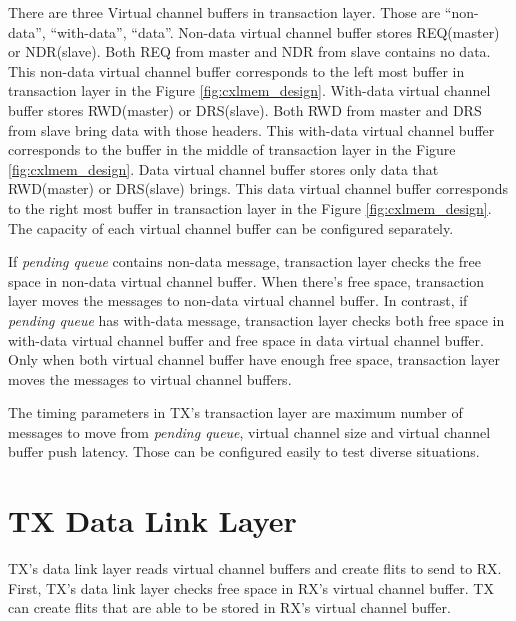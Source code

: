 There are three Virtual channel buffers in transaction layer. Those are ``non-data'', ``with-data'', ``data''. Non-data virtual channel buffer stores REQ(master) or NDR(slave). Both REQ from master and NDR from slave contains no data. This non-data virtual channel buffer corresponds to the left most buffer in transaction layer in the Figure \ref{fig:cxlmem_design}. With-data virtual channel buffer stores RWD(master) or DRS(slave). Both RWD from master and DRS from slave bring data with those headers. This with-data virtual channel buffer corresponds to the buffer in the middle of transaction layer in the Figure \ref{fig:cxlmem_design}. Data virtual channel buffer stores only data that RWD(master) or DRS(slave) brings. This data virtual channel buffer corresponds to the right most buffer in transaction layer in the Figure \ref{fig:cxlmem_design}. The capacity of each virtual channel buffer can be configured separately.

If \textit{pending queue} contains non-data message, transaction layer checks the free space in non-data virtual channel buffer. When there's free space, transaction layer moves the messages to non-data virtual channel buffer. In contrast, if \textit{pending queue} has with-data message, transaction layer checks both free space in with-data virtual channel buffer and free space in data virtual channel buffer. Only when both virtual channel buffer have enough free space, transaction layer moves the messages to virtual channel buffers.

The timing parameters in TX's transaction layer are maximum number of messages to move from \textit{pending queue}, virtual channel size and virtual channel buffer push latency. Those can be configured easily to test diverse situations.

\section{TX Data Link Layer} \label{sec:tx data link layer}
TX's data link layer reads virtual channel buffers and create flits to send to RX. First, TX's data link layer checks free space in RX's virtual channel buffer. TX can create flits that are able to be stored in RX's virtual channel buffer. 

